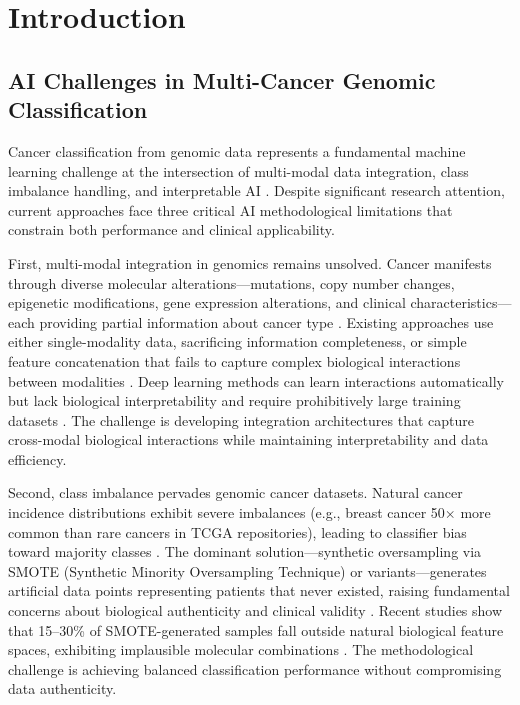 \documentclass[manuscript, screen, review]{jair}
\begin{document}

\maketitle

\section{Introduction}
\label{sec:introduction}

\subsection{AI Challenges in Multi-Cancer Genomic Classification}

Cancer classification from genomic data represents a fundamental machine learning challenge at the intersection of multi-modal data integration, class imbalance handling, and interpretable AI \citep{acosta2022multimodal,boehm2022harnessing}. Despite significant research attention, current approaches face three critical AI methodological limitations that constrain both performance and clinical applicability.

First, multi-modal integration in genomics remains unsolved. Cancer manifests through diverse molecular alterations---mutations, copy number changes, epigenetic modifications, gene expression alterations, and clinical characteristics---each providing partial information about cancer type \citep{hanahan2011hallmarks,vogelstein2013cancer}. Existing approaches use either single-modality data, sacrificing information completeness, or simple feature concatenation that fails to capture complex biological interactions between modalities \citep{huang2017more,picard2021integration}. Deep learning methods can learn interactions automatically but lack biological interpretability and require prohibitively large training datasets \citep{lecun2015deep,esteva2019guide}. The challenge is developing integration architectures that capture cross-modal biological interactions while maintaining interpretability and data efficiency.

Second, class imbalance pervades genomic cancer datasets. Natural cancer incidence distributions exhibit severe imbalances (e.g., breast cancer 50$\times$ more common than rare cancers in TCGA repositories), leading to classifier bias toward majority classes \citep{johnson2019survey,blagus2010class}. The dominant solution---synthetic oversampling via SMOTE (Synthetic Minority Oversampling Technique) or variants---generates artificial data points representing patients that never existed, raising fundamental concerns about biological authenticity and clinical validity \citep{blagus2013smote,fotouhi2019comprehensive}. Recent studies show that 15--30\% of SMOTE-generated samples fall outside natural biological feature spaces, exhibiting implausible molecular combinations \citep{elreedy2019comprehensive}. The methodological challenge is achieving balanced classification performance without compromising data authenticity.
\end{document}
